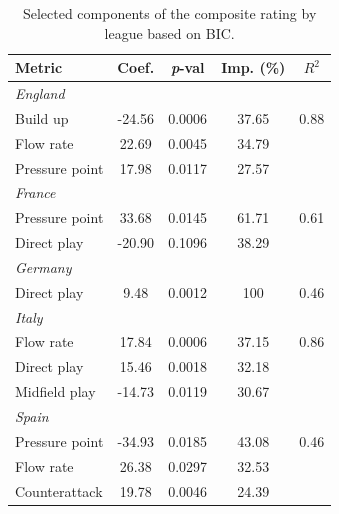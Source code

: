 \documentclass[preprint, amsmath,amssymb, pre]{revtex4-2}
\begin{document}
\begin{table}[htbp]
\centering
\caption{Selected components of the composite rating by league based on BIC.}
\label{tab:CR}
\normalsize %
\begin{tabular}{lcccc}
\toprule
\textbf{Metric} & \textbf{Coef.} & \textbf{{\it p}-val} & \textbf{Imp. (\%)} & \textbf{$R^2$} \\
\midrule
\multicolumn{5}{l}{\textit{England}} \\
Build up & -24.56 & 0.0006 & 37.65 & 0.88 \\
Flow rate & 22.69 & 0.0045 & 34.79 & \\
Pressure point & 17.98 & 0.0117 & 27.57 & \\
\midrule
\multicolumn{5}{l}{\textit{France}} \\
Pressure point & 33.68 & 0.0145 & 61.71 & 0.61 \\
Direct play & -20.90 & 0.1096 & 38.29 & \\
\midrule
\multicolumn{5}{l}{\textit{Germany}} \\
Direct play & 9.48 & 0.0012 & 100 & 0.46 \\
\midrule
\multicolumn{5}{l}{\textit{Italy}} \\
Flow rate & 17.84 & 0.0006 & 37.15 & 0.86 \\
Direct play & 15.46 & 0.0018 & 32.18 & \\
Midfield play & -14.73 & 0.0119 & 30.67 & \\
\midrule
\multicolumn{5}{l}{\textit{Spain}} \\
Pressure point & -34.93 & 0.0185 & 43.08 & 0.46 \\
Flow rate & 26.38 & 0.0297 & 32.53 & \\
Counterattack & 19.78 & 0.0046 & 24.39 & \\
\bottomrule
\end{tabular}
\end{table}



	
\end{document}
